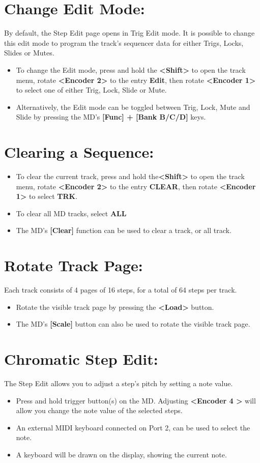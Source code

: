 \section{Change Edit Mode:}
By default, the Step Edit page opens in Trig Edit mode. It is possible to change this edit mode to program the track's sequencer data for either Trigs, Locks, Slides or Mutes.
\begin{itemize}
\item To change the Edit mode, press and hold the \textbf{<Shift>} to open the track menu, rotate \textbf{<Encoder 2>} to the entry \textbf{Edit}, then rotate \textbf{<Encoder 1>} to select one of either Trig, Lock, Slide or Mute.
\item Alternatively, the Edit mode can be toggled between Trig, Lock, Mute and Slide by pressing the MD's \textbf{[Func] + [Bank B/C/D]} keys.
\end{itemize}
\section{Clearing a Sequence:}
\begin{itemize}
\item To clear the current track, press and hold the\textbf{<Shift>} to open the track menu, rotate \textbf{<Encoder 2>} to the entry \textbf{CLEAR}, then rotate \textbf{<Encoder 1>} to select \textbf{TRK}.
\item To clear all MD tracks, select \textbf{ALL}
\item The MD's \textbf{[Clear]} function can be used to clear a track, or all track.
\end{itemize}
\section{Rotate Track Page:}
Each track consists of 4 pages of 16 steps, for a total of 64 steps per track.
\begin{itemize}
\item Rotate the visible track page by pressing the \textbf{<Load>} button.
\item The MD's \textbf{[Scale]} button can also be used to rotate the visible track page.
\end{itemize}
\section{Chromatic Step Edit:}
The Step Edit allows you to adjust a step's pitch by setting a note value. 
\begin{itemize}
\item Press and hold trigger button(s) on the MD. Adjusting \textbf{<Encoder 4 >} will allow you change the note value of the selected steps.
\item An external MIDI keyboard connected on Port 2, can be used to select the note.
\item A keyboard will be drawn on the display, showing the current note.
\end{itemize}
